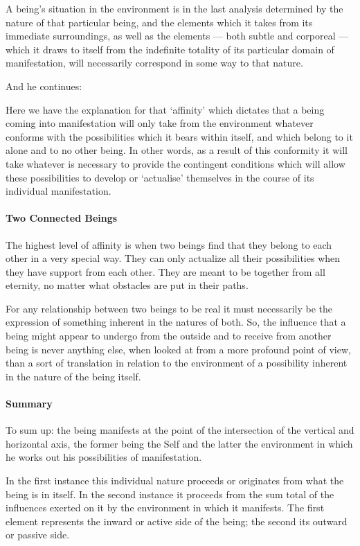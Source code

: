 \begin{quotex}
A being's situation in the environment is in the last analysis determined by the nature of that particular being, and the elements which it takes from its immediate surroundings, as well as the elements — both subtle and corporeal — which it draws to itself from the indefinite totality of its particular domain of manifestation, will necessarily correspond in some way to that nature. 

\end{quotex}
And he continues:

\begin{quotex}
Here we have the explanation for that `affinity' which dictates that a being coming into manifestation will only take from the environment whatever conforms with the possibilities which it bears within itself, and which belong to it alone and to no other being. In other words, as a result of this conformity it will take whatever is necessary to provide the contingent conditions which will allow these possibilities to develop or `actualise' themselves in the course of its individual manifestation. 

\end{quotex}
\paragraph{Two Connected Beings}
The highest level of affinity is when two beings find that they belong to each other in a very special way. They can only actualize all their possibilities when they have support from each other. They are meant to be together from all eternity, no matter what obstacles are put in their paths.

\begin{quotex}
For any relationship between two beings to be real it must necessarily be the expression of something inherent in the natures of both. So, the influence that a being might appear to undergo from the outside and to receive from another being is never anything else, when looked at from a more profound point of view, than a sort of translation in relation to the environment of a possibility inherent in the nature of the being itself.

\end{quotex}
\paragraph{Summary}
To sum up: the being manifests at the point of the intersection of the vertical and horizontal axis, the former being the Self and the latter the environment in which he works out his possibilities of manifestation.

\begin{quotex}
In the first instance this individual nature proceeds or originates from what the being is in itself. In the second instance it proceeds from the sum total of the influences exerted on it by the environment in which it manifests. The first element represents the inward or active side of the being; the second its outward or passive side.

\end{quotex}


